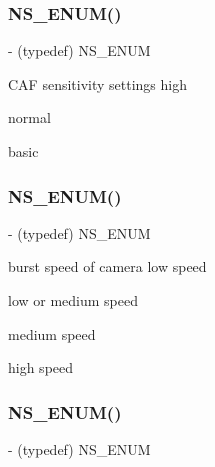 \subsubsection{\texorpdfstring{N\+S\+\_\+\+E\+N\+U\+M()}{NS\_ENUM()}\hspace{0.1cm}{\footnotesize\ttfamily [5/17]}}
{\footnotesize\ttfamily -\/ (typedef) N\+S\+\_\+\+E\+N\+UM \begin{DoxyParamCaption}\item[{(N\+S\+U\+Integer)}]{ }\item[{(P\+V\+Camera\+Video\+C\+A\+F\+Level)}]{ }\end{DoxyParamCaption}}

C\+AF sensitivity settings high

normal

basic\mbox{\label{interface_p_v_camera_settings_def_a09722499b1901cbe1482eb730dcfddf7}} 
\subsubsection{\texorpdfstring{N\+S\+\_\+\+E\+N\+U\+M()}{NS\_ENUM()}\hspace{0.1cm}{\footnotesize\ttfamily [6/17]}}
{\footnotesize\ttfamily -\/ (typedef) N\+S\+\_\+\+E\+N\+UM \begin{DoxyParamCaption}\item[{(N\+S\+U\+Integer)}]{ }\item[{(P\+V\+Eye\+Camera\+Continuous\+Shoot\+Speed)}]{ }\end{DoxyParamCaption}}

burst speed of camera low speed

low or medium speed

medium speed

high speed\mbox{\label{interface_p_v_camera_settings_def_adaa98aa8b13696b53d454d706f33dd32}} 
\subsubsection{\texorpdfstring{N\+S\+\_\+\+E\+N\+U\+M()}{NS\_ENUM()}\hspace{0.1cm}{\footnotesize\ttfamily [7/17]}}
{\footnotesize\ttfamily -\/ (typedef) N\+S\+\_\+\+E\+N\+UM \begin{DoxyParamCaption}\item[{(N\+S\+U\+Integer)}]{ }\item[{(P\+V\+Camera\+Video\+Shutter\+Speed)}]{ }\end{DoxyParamCaption}}

